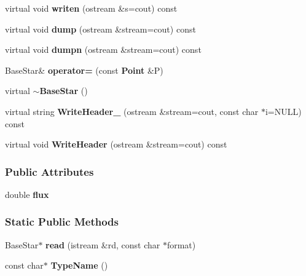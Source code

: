 \begin{CompactItemize}
\item 
{}
virtual void {\bf writen} (ostream \&s=cout) const\label{class_basestar_a7}

\item 
{}
virtual void {\bf dump} (ostream \&stream=cout) const\label{class_basestar_a8}

\item 
{}
virtual void {\bf dumpn} (ostream \&stream=cout) const\label{class_basestar_a9}

\item 
{}
Base\-Star\& {\bf operator=} (const {\bf Point} \&P)\label{class_basestar_a10}

\item 
{}
virtual {\bf $\sim$Base\-Star} ()\label{class_basestar_a11}

\item 
{}
virtual string {\bf Write\-Header\_\-} (ostream \&stream=cout, const char $\ast$i=NULL) const\label{class_basestar_a12}

\item 
{}
virtual void {\bf Write\-Header} (ostream \&stream=cout) const\label{class_basestar_a13}

\end{CompactItemize}
\subsubsection*{Public Attributes}
\begin{CompactItemize}
\item 
{}
double {\bf flux}\label{class_basestar_m0}

\end{CompactItemize}
\subsubsection*{Static Public Methods}
\begin{CompactItemize}
\item 
{}
Base\-Star$\ast$ {\bf read} (istream \&rd, const char $\ast$format)\label{class_basestar_d0}

\item 
{}
const char$\ast$ {\bf Type\-Name} ()\label{class_basestar_d1}

\end{CompactItemize}
